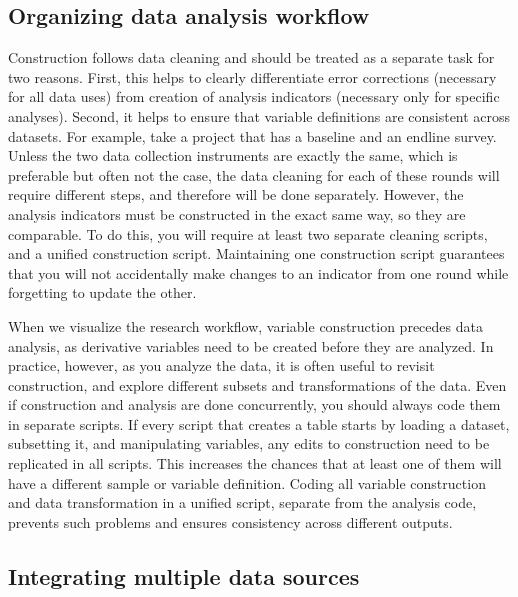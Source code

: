 \subsection{Organizing data analysis workflow}

Construction follows data cleaning and
should be treated as a separate task for two reasons.
First, this helps to clearly differentiate error corrections
(necessary for all data uses)
from creation of analysis indicators
(necessary only for specific analyses).
Second, it helps to ensure that variable definitions are
consistent across datasets.
For example, take a project that has a baseline and an endline survey.
Unless the two data collection instruments are exactly the same,
which is preferable but often not the case,
the data cleaning for each of these rounds will require different steps,
and therefore will be done separately.
However, the analysis indicators must be constructed in the exact same way,
so they are comparable.
To do this, you will require at least two separate cleaning scripts,
and a unified construction script.
Maintaining one construction script guarantees that you will not
accidentally make changes to an indicator from one round
while forgetting to update the other.

When we visualize the research workflow,
variable construction precedes data analysis,
as derivative variables need to be created before they are analyzed.
In practice, however, as you analyze the data,
it is often useful to revisit construction,
and explore different subsets and transformations of the data.
Even if construction and analysis are done concurrently,
you should always code them in separate scripts.
If every script that creates a table starts by loading a dataset,
subsetting it, and manipulating variables,
any edits to construction need to be replicated in all scripts.
This increases the chances that at least one of them
will have a different sample or variable definition.
Coding all variable construction and data transformation
in a unified script, separate from the analysis code,
prevents such problems and ensures consistency across different outputs.

\subsection{Integrating multiple data sources}

